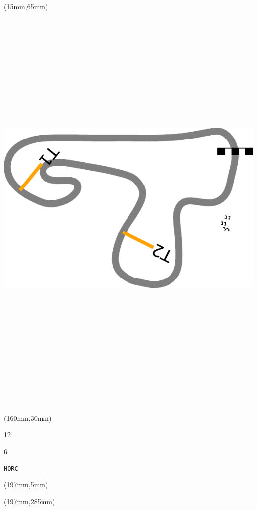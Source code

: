 \begin{textblock*}{185mm}(15mm,65mm)%
\centering
\mbox{\includegraphics[width=185mm,height=210mm,keepaspectratio]{PT/HORC.pdf}}
\end{textblock*}
\begin{textblock*}{40mm}(160mm,30mm)%
\Large
\par{} 
\par12 
\par6 
\par\hfill\tiny\tt HORC\\
\end{textblock*}
\begin{textblock*}{20mm}(197mm,5mm)%
\fbox{\thepage}
\label{HORC}
\end{textblock*}
\begin{textblock*}{20mm}(197mm,285mm)%
\fbox{\thepage}
\end{textblock*}

